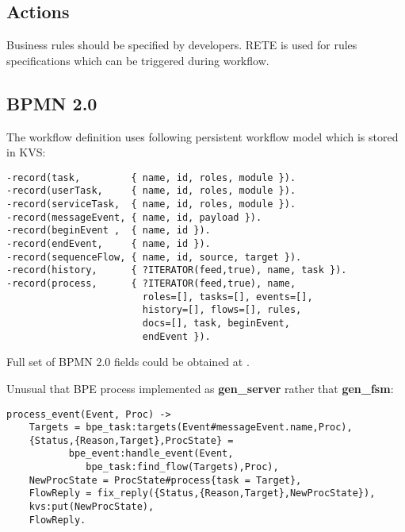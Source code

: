 \subsection{Actions}

Business rules should be specified by developers.
RETE is used for rules specifications which can be triggered during workflow.

\newpage

\subsection{BPMN 2.0}

The workflow definition uses following persistent workflow model which is stored in KVS:

\vspace{1\baselineskip}
\begin{lstlisting}
-record(task,         { name, id, roles, module }).
-record(userTask,     { name, id, roles, module }).
-record(serviceTask,  { name, id, roles, module }).
-record(messageEvent, { name, id, payload }).
-record(beginEvent ,  { name, id }).
-record(endEvent,     { name, id }).
-record(sequenceFlow, { name, id, source, target }).
-record(history,      { ?ITERATOR(feed,true), name, task }).
-record(process,      { ?ITERATOR(feed,true), name,
                        roles=[], tasks=[], events=[],
                        history=[], flows=[], rules,
                        docs=[], task, beginEvent,
                        endEvent }).
\end{lstlisting}

Full set of BPMN 2.0 fields could be obtained at .

\newpage

Unusual that BPE process implemented as {\bf gen\_server} rather
that {\bf gen\_fsm}:

\vspace{1\baselineskip}
\begin{lstlisting}[caption=Boundary Event]
process_event(Event, Proc) ->
    Targets = bpe_task:targets(Event#messageEvent.name,Proc),
    {Status,{Reason,Target},ProcState} =
           bpe_event:handle_event(Event,
              bpe_task:find_flow(Targets),Proc),
    NewProcState = ProcState#process{task = Target},
    FlowReply = fix_reply({Status,{Reason,Target},NewProcState}),
    kvs:put(NewProcState),
    FlowReply.
\end{lstlisting}

